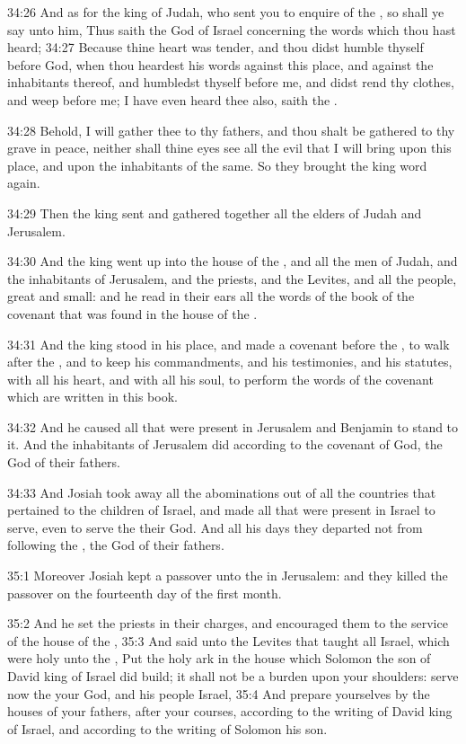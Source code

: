 34:26 And as for the king of Judah, who sent you to enquire of the
\LORD, so shall ye say unto him, Thus saith the \LORD God of Israel
concerning the words which thou hast heard; 34:27 Because thine heart
was tender, and thou didst humble thyself before God, when thou
heardest his words against this place, and against the inhabitants
thereof, and humbledst thyself before me, and didst rend thy clothes,
and weep before me; I have even heard thee also, saith the \LORD.

34:28 Behold, I will gather thee to thy fathers, and thou shalt be
gathered to thy grave in peace, neither shall thine eyes see all the
evil that I will bring upon this place, and upon the inhabitants of
the same. So they brought the king word again.

34:29 Then the king sent and gathered together all the elders of Judah
and Jerusalem.

34:30 And the king went up into the house of the \LORD, and all the men
of Judah, and the inhabitants of Jerusalem, and the priests, and the
Levites, and all the people, great and small: and he read in their
ears all the words of the book of the covenant that was found in the
house of the \LORD.

34:31 And the king stood in his place, and made a covenant before the
\LORD, to walk after the \LORD, and to keep his commandments, and his
testimonies, and his statutes, with all his heart, and with all his
soul, to perform the words of the covenant which are written in this
book.

34:32 And he caused all that were present in Jerusalem and Benjamin to
stand to it. And the inhabitants of Jerusalem did according to the
covenant of God, the God of their fathers.

34:33 And Josiah took away all the abominations out of all the
countries that pertained to the children of Israel, and made all that
were present in Israel to serve, even to serve the \LORD their God. And
all his days they departed not from following the \LORD, the God of
their fathers.

35:1 Moreover Josiah kept a passover unto the \LORD in Jerusalem: and
they killed the passover on the fourteenth day of the first month.

35:2 And he set the priests in their charges, and encouraged them to
the service of the house of the \LORD, 35:3 And said unto the Levites
that taught all Israel, which were holy unto the \LORD, Put the holy
ark in the house which Solomon the son of David king of Israel did
build; it shall not be a burden upon your shoulders: serve now the
\LORD your God, and his people Israel, 35:4 And prepare yourselves by
the houses of your fathers, after your courses, according to the
writing of David king of Israel, and according to the writing of
Solomon his son.

